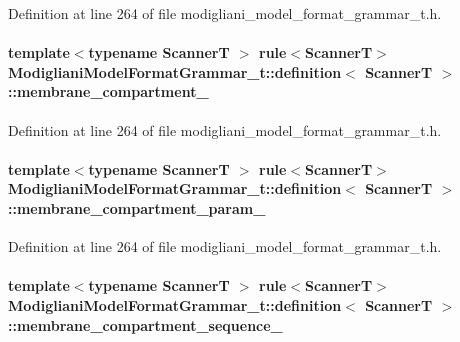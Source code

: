 Definition at line 264 of file modigliani\_\-model\_\-format\_\-grammar\_\-t.h.

\paragraph[{membrane\_\-compartment\_\-}]{\setlength{\rightskip}{0pt plus 5cm}template$<$typename ScannerT $>$ rule$<$ScannerT$>$ {\bf ModiglianiModelFormatGrammar\_\-t::definition}$<$ ScannerT $>$::{\bf membrane\_\-compartment\_\-}}\hfill\label{struct_modigliani_model_format_grammar__t_1_1definition_a66b261c975e102ce60c1289acfaa686b}


Definition at line 264 of file modigliani\_\-model\_\-format\_\-grammar\_\-t.h.

\paragraph[{membrane\_\-compartment\_\-param\_\-}]{\setlength{\rightskip}{0pt plus 5cm}template$<$typename ScannerT $>$ rule$<$ScannerT$>$ {\bf ModiglianiModelFormatGrammar\_\-t::definition}$<$ ScannerT $>$::{\bf membrane\_\-compartment\_\-param\_\-}}\hfill\label{struct_modigliani_model_format_grammar__t_1_1definition_ac8b0964ac7d8adbaa00a2a0bbb988064}


Definition at line 264 of file modigliani\_\-model\_\-format\_\-grammar\_\-t.h.

\paragraph[{membrane\_\-compartment\_\-sequence\_\-}]{\setlength{\rightskip}{0pt plus 5cm}template$<$typename ScannerT $>$ rule$<$ScannerT$>$ {\bf ModiglianiModelFormatGrammar\_\-t::definition}$<$ ScannerT $>$::{\bf membrane\_\-compartment\_\-sequence\_\-}}\hfill\label{struct_modigliani_model_format_grammar__t_1_1definition_aacdcecc91074e2cadd0ccbae8bea6023}


